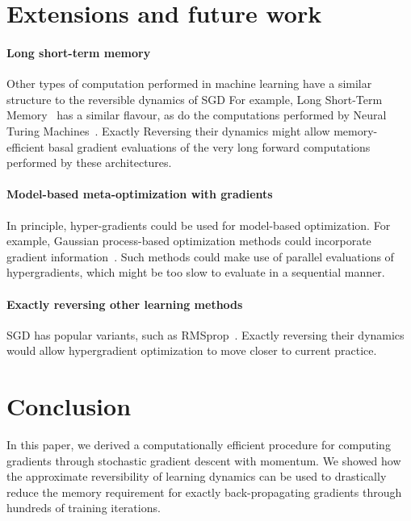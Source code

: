 \documentclass{article}
\newcommand{\primal}{basal}
\begin{document}
\section{Extensions and future work}

\paragraph{Long short-term memory}
Other types of computation performed in machine learning have a similar structure to the reversible dynamics of SGD
For example, Long Short-Term Memory~\citep{hochreiter1997long} has a similar flavour, as do the computations performed by Neural Turing Machines~\citep{graves2014neural}.
Exactly Reversing their dynamics might allow memory-efficient \primal{} gradient evaluations of the very long forward computations performed by these architectures.

\paragraph{Model-based meta-optimization with gradients}
In principle, hyper-gradients could be used for model-based optimization.
For example, Gaussian process-based optimization methods could incorporate gradient information~\cite{solak2003derivative}.
Such methods could make use of parallel evaluations of hypergradients, which might be too slow to evaluate in a sequential manner.

\paragraph{Exactly reversing other learning methods}
SGD has popular variants, such as RMSprop~\cite{Tieleman2012}.
Exactly reversing their dynamics would allow hypergradient optimization to move closer to current practice.


\section{Conclusion}

In this paper, we derived a computationally efficient procedure for computing gradients through stochastic gradient descent with momentum.
We showed how the approximate reversibility of learning dynamics can be used to drastically reduce the memory requirement for exactly back-propagating gradients through hundreds of training iterations.
\end{document}
